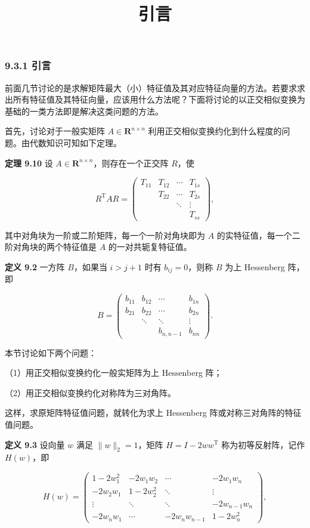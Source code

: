 \documentclass[
  10pt,
  fontset=fandol]{ctexart}
\title{引言}
\author{}
\date{}
\begin{document}
\maketitle

\subsubsection{9.3.1 引言}\label{ux5f15ux8a00}

前面几节讨论的是求解矩阵最大（小）特征值及其对应特征向量的方法。若要求求出所有特征值及其特征向量，应该用什么方法呢？下面将讨论的以正交相似变换为基础的一类方法即是解决这类问题的方法。

首先，讨论对于一般实矩阵 \(A\in\mathbf R^{n\times n}\) 利用正交相似变换约化到什么程度的问题。由代数知识可知如下定理。

\textbf{定理 9.10} 设 \(A\in\mathbf R^{n\times n}\)，则存在一个正交阵 \(R\)，使

\[
R^{\mathrm T}AR=\begin{pmatrix}
T_{11}&T_{12}&\cdots&T_{1s}\\
&T_{22}&\cdots&T_{2s}\\
&&\ddots&\vdots\\
&&&T_{ss}
\end{pmatrix},
\]

其中对角块为一阶或二阶矩阵，每一个一阶对角块即为 \(A\) 的实特征值，每一个二阶对角块的两个特征值是 \(A\) 的一对共轭复特征值。

\textbf{定义 9.2} 一方阵 \(B\)，如果当 \(i>j+1\) 时有 \(b_{ij}=0\)，则称 \(B\) 为上 Hessenberg 阵，即

\[
B=\begin{pmatrix}
b_{11}&b_{12}&\cdots&b_{1n}\\
b_{21}&b_{22}&\cdots&b_{2n}\\
&\ddots&\ddots&\vdots\\
&&b_{n,n-1}&b_{nn}
\end{pmatrix}.
\]

本节讨论如下两个问题：

（1）用正交相似变换约化一般实矩阵为上 Hessenberg 阵；

（2）用正交相似变换约化对称阵为三对角阵。

这样，求原矩阵特征值问题，就转化为求上 Hessenberg 阵或对称三对角阵的特征值问题。

\textbf{定义 9.3} 设向量 \(w\) 满足 \(\|w\|_2=1\)，矩阵 \(H=I-2ww^{\mathrm T}\) 称为初等反射阵，记作 \(H(w)\)，即

\[
H(w)=\begin{pmatrix}
1-2w_1^2&-2w_1w_2&\cdots&-2w_1w_n\\
-2w_2w_1&1-2w_2^2&\ddots&\vdots\\
\vdots&\ddots&\ddots&-2w_{n-1}w_n\\
-2w_nw_1&\cdots&-2w_nw_{n-1}&1-2w_n^2
\end{pmatrix},
\]
\end{document}
